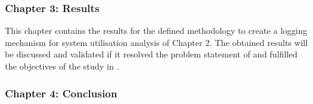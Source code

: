 \subsubsection{Chapter 3: Results}
This chapter contains the results for the defined methodology to create a logging mechanism for system utilisation analysis of Chapter 2. The obtained results will be discussed and validated if it resolved the problem statement of  and fulfilled the objectives of the study in .

\subsubsection{Chapter 4: Conclusion}
